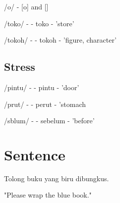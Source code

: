 \documentclass[a4paper, 12pt]{article}
\begin{document}
/o/ - [o] and [\textopeno] \\ \medskip

/toko/ - \textipa{["\|[toko]} - toko - 'store'

/tokoh/ - \textipa{[\|[tO"kOh]} - tokoh - 'figure, character'

\medskip


\subsection{Stress}

/pintu/ - \textipa{["pin\|[tu]} - pintu - 'door'

/p{\textschwa}rut/ - \textipa{[p@"ro\|[t]} - perut - 'stomach

/s{\textschwa}b{\textschwa}lum/ - \textipa{[""s@b@"lom]} - sebelum - 'before'

\section{Sentence}

Tolong buku yang biru dibungkus.

\medskip


\medskip

"Please wrap the blue book."
\end{document}
